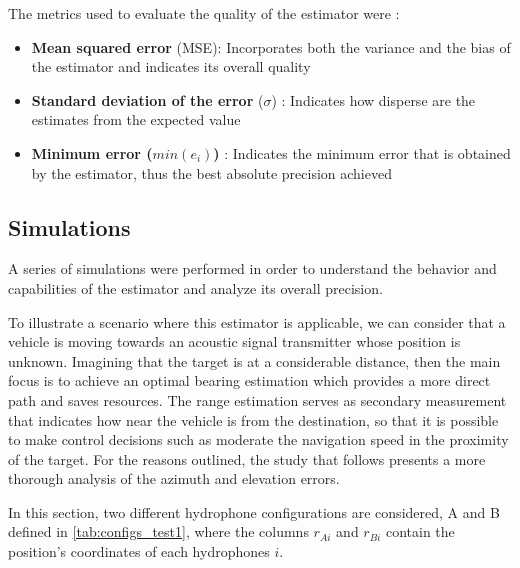The metrics used to evaluate the quality of the estimator were :

\begin{itemize}
	\item \textbf{Mean squared error} (MSE): Incorporates both the variance and the bias of the estimator and indicates its overall quality
	\item \textbf{Standard deviation of the error} ($\sigma$) : Indicates how disperse are the estimates from the expected value
	\item \textbf{Minimum error ($min(e_i)$)} : Indicates the minimum error that is obtained by the estimator, thus the best absolute precision achieved
\end{itemize} 

\subsection{Simulations}

A series of simulations were performed in order to understand the behavior and capabilities of the estimator and analyze its overall precision.

To illustrate a scenario where this estimator is applicable, we can consider that a vehicle is moving towards an acoustic signal transmitter whose position is unknown. Imagining that the target is at a considerable distance, then the main focus is to achieve an optimal bearing estimation which provides a more direct path and saves resources. The range estimation serves as secondary measurement that indicates how near the vehicle is from the destination, so that it is possible to make control decisions such as moderate the navigation speed in the proximity of the target. For the reasons outlined, the study that follows presents a more thorough analysis of the azimuth and elevation errors. 

In this section, two different hydrophone configurations are considered, A and B defined in \ref{tab:configs_test1}, where the columns $r_{Ai}$ and $r_{Bi}$ contain the position's coordinates of each hydrophones $i$.

